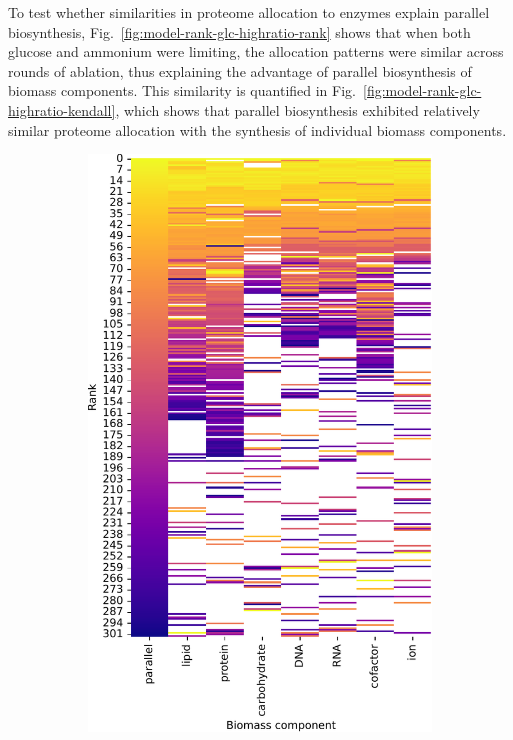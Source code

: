 To test whether similarities in proteome allocation to enzymes explain parallel biosynthesis, Fig.\ \ref{fig:model-rank-glc-highratio-rank} shows that when both glucose and ammonium were limiting, the allocation patterns were similar across rounds of ablation, thus explaining the advantage of parallel biosynthesis of biomass components.
This similarity is quantified in Fig.\ \ref{fig:model-rank-glc-highratio-kendall}, which shows that parallel biosynthesis exhibited relatively similar proteome allocation with the synthesis of individual biomass components.

\begin{figure}
  \centering
  \begin{subfigure}[t]{0.45\textwidth}
  \centering
    \includegraphics[width=\linewidth]{CompareEnzUse_glc01p69_pyrUnres_amm01p05_1.pdf}

\end{subfigure}
\end{figure}
